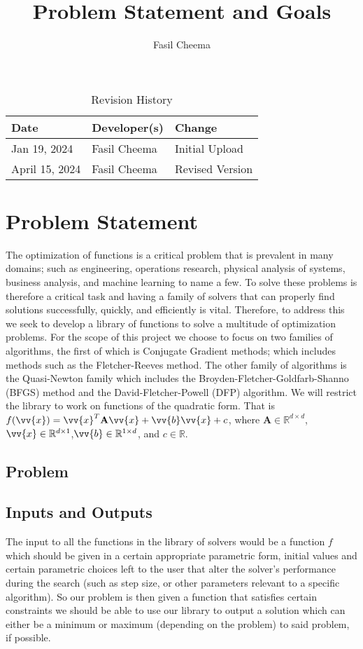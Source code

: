 \documentclass{article}
\title{Problem Statement and Goals\\\progname}
\author{Fasil Cheema}
\begin{document}
\maketitle

\begin{table}[hp]
\caption{Revision History} \label{TblRevisionHistory}
\begin{tabularx}{\textwidth}{llX}
\toprule
\textbf{Date} & \textbf{Developer(s)} & \textbf{Change}\\
\midrule
Jan 19, 2024 & Fasil Cheema & Initial Upload\\
April 15, 2024 & Fasil Cheema & Revised Version\\
\bottomrule
\end{tabularx}
\end{table}

\section{Problem Statement}

The optimization of functions is a critical problem that is prevalent in many domains; such as engineering, operations research, physical analysis of systems, business analysis, and machine learning to name a few. To solve these problems is therefore a critical task and having a family of solvers that can properly find solutions successfully, quickly, and efficiently is vital. Therefore, to address this we seek to develop a library of functions to solve a multitude of optimization problems. For the scope of this project we choose to focus on two families of algorithms, the first of which is Conjugate Gradient methods; which includes methods such as the Fletcher-Reeves method. The other family of algorithms is the Quasi-Newton family which includes the Broyden-Fletcher-Goldfarb-Shanno (BFGS) method and the David-Fletcher-Powell (DFP) algorithm. We will restrict the library to work on functions of the quadratic form. That is $f(\vv{x}) = \vv{x}^{T}\mathbf{A}\vv{x} + \vv{b}\vv{x} + c$, where $\mathbf{A} \in \mathbb{R}^{d \times d}$,$\vv{x} \in \mathbb{R}^{d \times 1}$,$\vv{b} \in \mathbb{R}^{1 \times d}$, and $c \in \mathbb{R}$.
\\

\subsection{Problem}

\subsection{Inputs and Outputs}
The input to all the functions in the library of solvers would be a function $f$ which should be given in a certain appropriate parametric form, initial values and certain parametric choices left to the user that alter the solver's performance during the search (such as step size, or other parameters relevant to a specific algorithm).  So our problem is then given a function that satisfies certain constraints we should be able to use our library to output a solution which can either be a minimum or maximum (depending on the problem) to said problem, if possible.
\\
\end{document}
